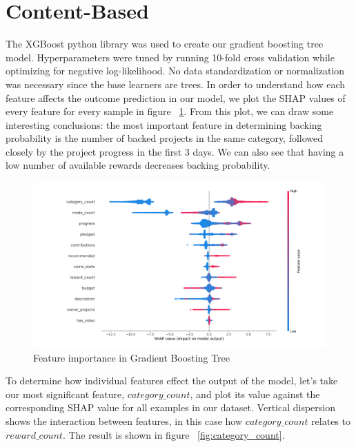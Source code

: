 \documentclass[cic,tc,english]{iiufrgs}
\begin{document}
\section{Content-Based}
The XGBoost python library was used to create our gradient boosting tree model. Hyperparameters were tuned by running 10-fold cross validation while optimizing for negative log-likelihood. No data standardization or normalization was necessary since the base learners are trees. In order to understand how each feature affects the outcome prediction in our model, we plot the SHAP \cite{Lundberg2017} values of every feature for every sample in figure ~\ref{fig:features_importance}. From this plot, we can draw some interesting conclusions: the most important feature in determining backing probability is the number of backed projects in the same category, followed closely by the project progress in the first 3 days. We can also see that having a low number of available rewards decreases backing probability.

\begin{figure}
    \caption{Feature importance in Gradient Boosting Tree}
    \begin{center}
        \includegraphics[width=\textwidth]{feature_contribution}
    \end{center}
    \label{fig:features_importance}
\end{figure}

To determine how individual features effect the output of the model, let's take our most significant feature, $category\_count$, and plot its value against the corresponding SHAP value for all examples in our dataset. Vertical dispersion shows the interaction between features, in this case how $category\_count$ relates to $reward\_count$. The result is shown in figure ~\ref{fig:category_count}.
\end{document}
